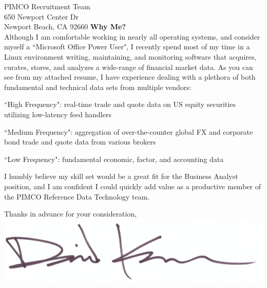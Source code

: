 \documentclass{letter}
\begin{document}
\begin{letter}{
  PIMCO Recruitment Team \\
  650 Newport Center Dr \\
  Newport Beach, CA 92660
}
\textbf{Why Me?} \\
Although I am comfortable working in nearly all operating systems, and consider
myself a ``Microsoft Office Power User", I recently spend most of my time
in a Linux environment writing, maintaining, and monitoring software that acquires,
curates, stores, and analyzes a wide-range of financial market data. As you can
see from my attached resume, I have experience dealing with a plethora of both
fundamental and technical data sets from multiple vendors:
\begin{list}{}{\leftmargin=1em}
  \item ``High Frequency": real-time trade and quote data on US equity securities
  utilizing low-latency feed handlers
  \item ``Medium Frequency": aggregation of over-the-counter global FX and
  corporate bond trade and quote data from various brokers
  \item ``Low Frequency": fundamental economic, factor, and accounting data
\end{list}
I humbly believe my skill set would be a great fit for the Business Analyst position,
and I am confident I could quickly add value as a productive member of the PIMCO
Reference Data Technology team.

\closing{
  Thanks in advance for your consideration, \\
  \includegraphics[scale=0.33]{signature.png}
}

\end{letter}
\end{document}
